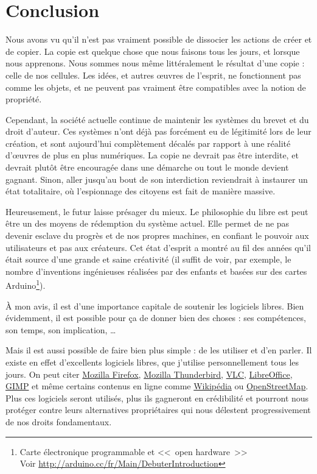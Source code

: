 \chapter*{Conclusion}

Nous avons vu qu'il n'est pas vraiment possible de dissocier les actions de créer et de copier.
La copie est quelque chose que nous faisons tous les jours, et lorsque nous apprenons.
Nous sommes nous même littéralement le résultat d'une copie : celle de nos cellules.
Les idées, et autres œuvres de l'esprit, ne fonctionnent pas comme les objets, et ne peuvent pas vraiment être compatibles avec la notion de propriété.

Cependant, la société actuelle continue de maintenir les systèmes du brevet et du droit d'auteur.
Ces systèmes n'ont déjà pas forcément eu de légitimité lors de leur création, et sont aujourd'hui complètement décalés par rapport à une réalité d'œuvres de plus en plus numériques.
La copie ne devrait pas être interdite, et devrait plutôt être encouragée dans une démarche ou tout le monde devient gagnant.
Sinon, aller jusqu'au bout de son interdiction reviendrait à instaurer un état totalitaire, où l'espionnage des citoyens est fait de manière massive.

Heureusement, le futur laisse présager du mieux.
Le philosophie du libre est peut être un des moyens de rédemption du système actuel.
Elle permet de ne pas devenir esclave du progrès et de nos propres machines, en confiant le pouvoir aux utilisateurs et pas aux créateurs.
Cet état d'esprit a montré au fil des années qu'il était source d'une grande et saine créativité (il suffit de voir, par exemple, le nombre d'inventions ingénieuses réalisées par des enfants et basées sur des cartes Arduino\footnote{Carte électronique programmable et <<~open hardware~>>\\Voir \url{http://arduino.cc/fr/Main/DebuterIntroduction}}).

À mon avis, il est d'une importance capitale de soutenir les logiciels libres.
Bien évidemment, il est possible pour ça de donner bien des choses : ses compétences, son temps, son implication, \dots{}

Mais il est aussi possible de faire bien plus simple : de les utiliser et d'en parler.
Il existe en effet d'excellents logiciels libres, que j'utilise personnellement tous les jours.
On peut citer \href{https://www.mozilla.org/fr/firefox/new/}{Mozilla Firefox}, \href{https://www.mozilla.org/fr/thunderbird/}{Mozilla Thunderbird}, \href{https://www.videolan.org/vlc/}{VLC}, \href{http://fr.libreoffice.org/}{LibreOffice}, \href{http://www.gimp.org/}{GIMP} et même certains contenus en ligne comme \href{https://fr.wikipedia.org/}{Wikipédia} ou \href{http://www.openstreetmap.org/}{OpenStreetMap}.
Plus ces logiciels seront utilisés, plus ils gagneront en crédibilité et pourront nous protéger contre leurs alternatives propriétaires qui nous délestent progressivement de nos droits fondamentaux.


